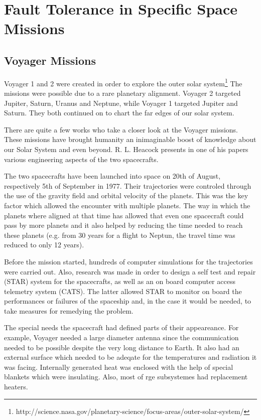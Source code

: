 \section{Fault Tolerance in Specific Space Missions}

 
\subsection{Voyager Missions}

Voyager 1 and 2 \cite{vo1-nasa}\cite{vo2-nasa} were created in order to explore
the outer solar
system\footnote{http://science.nasa.gov/planetary-science/focus-areas/outer-solar-system/}
The missions were possible due to a rare planetary alignment. Voyager 2 targeted
Jupiter, Saturn, Uranus and Neptune, while Voyager 1 targeted Jupiter and
Saturn. They both continued on to chart the far edges of our solar system.

There are quite a few works who take a closer look at the Voyager missions.
These missions have brought humanity an inimaginable boost of knowledge about
our Solar System and even beyond. R. L. Heacock presents in one of his
papers~\cite{tvs} various engineering aspects of the two spacecrafts.

The two spacecrafts have been launched into space on 20th of August,
respectively 5th of September in 1977. Their trajectories were controled through
the use of the gravity field and orbital velocity of the planets. This was the
key factor which allowed the encounter with multiple planets. The way in which
the planets where aligned at that time has allowed that even one spacecraft
could pass by more planets and it also helped by reducing the time needed to
reach these planets (e.g. from 30 years for a flight to Neptun, the travel time
was reduced to only 12 years).

Before the mission started, hundreds of computer simulations for the
trajectories were carried out. Also, research was made in order to design a self
test and repair (STAR) system for the spacecrafts, as well as an on board
computer access telemetry system (CATS). The latter allowed STAR to monitor on
board the performances or failures of the spaceship and, in the case it would be
needed, to take measures for remedying the problem.

The special needs the spacecraft had defined parts of their appeareance. For
example, Voyager needed a large diameter antenna since the communication needed
to be possible despite the very long distance to Earth. It also had an external
surface which needed to be adeqate for the temperatures and radiation it was
facing. Internally generated heat was enclosed with the help of special blankets
which were insulating. Also, most of rge subsystemes had replacement heaters.

